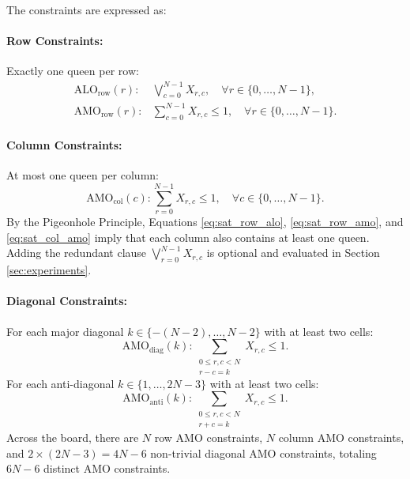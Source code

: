\documentclass[a4paper,fleqn]{cas-sc}
\begin{document}
The constraints are expressed as:
\paragraph{Row Constraints:} Exactly one queen per row:
\begin{align}
    \text{ALO}_{\text{row}}(r): & \bigvee_{c=0}^{N-1} X_{r, c}, \quad \forall r \in \{0, \dots, N-1\}, \label{eq:sat_row_alo} \\
    \text{AMO}_{\text{row}}(r): & \sum_{c=0}^{N-1} X_{r, c} \le 1, \quad \forall r \in \{0, \dots, N-1\}. \label{eq:sat_row_amo}
\end{align}

\paragraph{Column Constraints:} At most one queen per column:
\begin{equation}
    \text{AMO}_{\text{col}}(c): \sum_{r=0}^{N-1} X_{r, c} \le 1, \quad \forall c \in \{0, \dots, N-1\}. \label{eq:sat_col_amo}
\end{equation}
By the Pigeonhole Principle, Equations \eqref{eq:sat_row_alo}, \eqref{eq:sat_row_amo}, and \eqref{eq:sat_col_amo} imply that each column also contains at least one queen. Adding the redundant clause $\bigvee_{r=0}^{N-1} X_{r, c}$ is optional and evaluated in Section \ref{sec:experiments}.

\paragraph{Diagonal Constraints:} For each major diagonal $k \in \{-(N-2), \dots, N-2\}$ with at least two cells:
\begin{equation}
    \text{AMO}_{\text{diag}}(k): \sum_{\substack{0 \le r, c < N \\ r - c = k}} X_{r, c} \le 1. \label{eq:sat_diag_amo}
\end{equation}
For each anti-diagonal $k \in \{1, \dots, 2N-3\}$ with at least two cells:
\begin{equation}
    \text{AMO}_{\text{anti}}(k): \sum_{\substack{0 \le r, c < N \\ r + c = k}} X_{r, c} \le 1. \label{eq:sat_anti_amo}
\end{equation}
Across the board, there are $N$ row AMO constraints, $N$ column AMO constraints, and $2 \times (2N-3) = 4N-6$ non-trivial diagonal AMO constraints, totaling $6N-6$ distinct AMO constraints.
\end{document}

